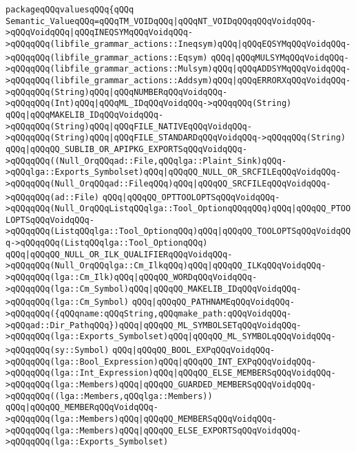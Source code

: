 \verb|packageqQQqvaluesqQQq{qQQq|\newline
\verb|Semantic_ValueqQQq=qQQqTM_VOIDqQQq|\verb#|qQQqNT_VOIDqQQqqQQqVoidqQQq->qQQqVoidqQQq|qQQqINEQSYMqQQqVoidqQQq->qQQqqQQq(libfile_grammar_actions::Ineqsym)qQQq|qQQqEQSYMqQQqVoidqQQq->qQQqqQQq(libfile_grammar_actions::Eqsym)#\newline
\verb|qQQq|\verb#|qQQqMULSYMqQQqVoidqQQq->qQQqqQQq(libfile_grammar_actions::Mulsym)qQQq|qQQqADDSYMqQQqVoidqQQq->qQQqqQQq(libfile_grammar_actions::Addsym)qQQq|qQQqERRORXqQQqVoidqQQq->qQQqqQQq(String)qQQq|qQQqNUMBERqQQqVoidqQQq->qQQqqQQq(Int)qQQq|qQQqML_IDqQQqVoidqQQq->qQQqqQQq(String)#\newline
\verb|qQQq|\verb#|qQQqMAKELIB_IDqQQqVoidqQQq->qQQqqQQq(String)qQQq|qQQqFILE_NATIVEqQQqVoidqQQq->qQQqqQQq(String)qQQq|qQQqFILE_STANDARDqQQqVoidqQQq->qQQqqQQq(String)#\newline
\verb|qQQq|\verb#|qQQqQQ_SUBLIB_OR_APIPKG_EXPORTSqQQqVoidqQQq->qQQqqQQq((Null_OrqQQqad::File,qQQqlga::Plaint_Sink)qQQq->qQQqlga::Exports_Symbolset)qQQq|qQQqQQ_NULL_OR_SRCFILEqQQqVoidqQQq->qQQqqQQq(Null_OrqQQqad::FileqQQq)qQQq|qQQqQQ_SRCFILEqQQqVoidqQQq->qQQqqQQq(ad::File)#\newline
\verb|qQQq|\verb#|qQQqQQ_OPTTOOLOPTSqQQqVoidqQQq->qQQqqQQq(Null_OrqQQqListqQQqlga::Tool_OptionqQQqqQQq)qQQq|qQQqQQ_PTOOLOPTSqQQqVoidqQQq->qQQqqQQq(ListqQQqlga::Tool_OptionqQQq)qQQq|qQQqQQ_TOOLOPTSqQQqVoidqQQq->qQQqqQQq(ListqQQqlga::Tool_OptionqQQq)#\newline
\verb|qQQq|\verb#|qQQqQQ_NULL_OR_ILK_QUALIFIERqQQqVoidqQQq->qQQqqQQq(Null_OrqQQqlga::Cm_IlkqQQq)qQQq|qQQqQQ_ILKqQQqVoidqQQq->qQQqqQQq(lga::Cm_Ilk)qQQq|qQQqQQ_WORDqQQqVoidqQQq->qQQqqQQq(lga::Cm_Symbol)qQQq|qQQqQQ_MAKELIB_IDqQQqVoidqQQq->qQQqqQQq(lga::Cm_Symbol)#\newline
\verb|qQQq|\verb#|qQQqQQ_PATHNAMEqQQqVoidqQQq->qQQqqQQq({qQQqname:qQQqString,qQQqmake_path:qQQqVoidqQQq->qQQqad::Dir_PathqQQq})qQQq|qQQqQQ_ML_SYMBOLSETqQQqVoidqQQq->qQQqqQQq(lga::Exports_Symbolset)qQQq|qQQqQQ_ML_SYMBOLqQQqVoidqQQq->qQQqqQQq(sy::Symbol)#\newline
\verb|qQQq|\verb#|qQQqQQ_BOOL_EXPqQQqVoidqQQq->qQQqqQQq(lga::Bool_Expression)qQQq|qQQqQQ_INT_EXPqQQqVoidqQQq->qQQqqQQq(lga::Int_Expression)qQQq|qQQqQQ_ELSE_MEMBERSqQQqVoidqQQq->qQQqqQQq(lga::Members)qQQq|qQQqQQ_GUARDED_MEMBERSqQQqVoidqQQq->qQQqqQQq((lga::Members,qQQqlga::Members))#\newline
\verb|qQQq|\verb#|qQQqQQ_MEMBERqQQqVoidqQQq->qQQqqQQq(lga::Members)qQQq|qQQqQQ_MEMBERSqQQqVoidqQQq->qQQqqQQq(lga::Members)qQQq|qQQqQQ_ELSE_EXPORTSqQQqVoidqQQq->qQQqqQQq(lga::Exports_Symbolset)#\newline
